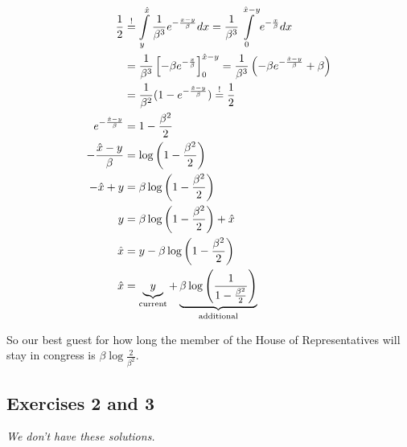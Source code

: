 \documentclass[../main/Notes.tex]{subfiles}
\begin{document}
\begin{align*}
\frac{1}{2} &\stackrel{!}{=} \int\limits_y^{\est{x}} \frac{1}{\beta^3} e^{-\frac{x-y}{\beta} } dx = \frac{1}{\beta^3} \int\limits_0^{\est{x}-y} e^{-\frac{x}{\beta}} dx \\
&= \frac{1}{\beta^3} \left[-\beta e^{-\frac{x}{\beta}}\right]_0^{\est{x}-y} = \frac{1}{\beta^3} \left( -\beta e^{-\frac{\est{x}-y}{\beta}} + \beta \right) \\
&= \frac{1}{\beta^2}( 1 - e^{-\frac{\est{x}-y}{\beta}}) \stackrel{!}{=} \frac{1}{2} \\
e^{-\frac{\est{x}-y}{\beta}} &= 1 - \frac{\beta^2}{2} \\
-\frac{\est{x}-y}{\beta} &= \log {\left(1 - \frac{\beta^2}{2}\right)} \\
-\est{x}+y &= \beta \log{\left(1-\frac{\beta^2}{2}\right)} \\
y &= \beta \log{\left(1 - \frac{\beta^2}{2}\right)} + \est{x}\\
\est{x} &= y-\beta \log{\left(1 - \frac{\beta^2}{2}\right)} \\
\est{x} &= \underbrace{y}_{\text{current}}+\underbrace{\beta \log{\left(\frac{1}{1-\frac{\beta^2}{2}}\right)}}_{\text{additional}}
\end{align*}

So our best guest for how long the member of the House of Representatives will stay in congress is $\beta \log{\frac{2}{\beta^2}}$.



\subsection*{Exercises 2 and 3}
\emph{We don't have these solutions.}
\end{document}

